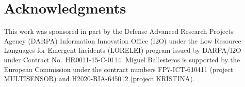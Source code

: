\documentclass[11pt,letterpaper]{article}
\begin{document}


\section*{Acknowledgments}
This work was sponsored in part by the Defense Advanced Research Projects Agency (DARPA)
Information Innovation Office (I2O) under the Low Resource Languages for Emergent Incidents (LORELEI) program issued by DARPA/I2O under Contract No.~HR0011-15-C-0114. Miguel Ballesteros is supported by the European Commission under the contract numbers FP7-ICT-610411 (project MULTISENSOR) and H2020-RIA-645012 (project KRISTINA).



\end{document}
